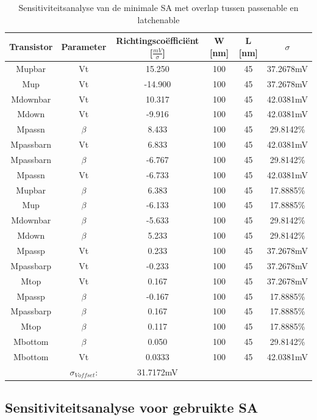 \begin{table}
\begin{tabular}{cccccc}
\hline 
Transistor & Parameter & Richtingscoëfficiënt [$\frac{mV}{\sigma}$] & W [nm] & L [nm] & $\sigma$ \\ 
\hline 
Mupbar & Vt & 15.250 & 100 & 45 & 37.2678mV \\ 
Mup & Vt & -14.900 & 100 & 45 & 37.2678mV \\ 
Mdownbar & Vt & 10.317 & 100 & 45 & 42.0381mV \\ 
Mdown & Vt & -9.916 & 100 & 45 & 42.0381mV \\
Mpassn & $\beta$ & 8.433 & 100 & 45 & 29.8142\% \\ 
Mpassbarn & Vt & 6.833 & 100 & 45 & 42.0381mV \\
Mpassbarn & $\beta$ & -6.767 & 100 & 45 & 29.8142\% \\
Mpassn & Vt & -6.733 & 100 & 45 & 42.0381mV \\ 
Mupbar & $\beta$ & 6.383 & 100 & 45 & 17.8885\% \\ 
Mup & $\beta$ & -6.133 & 100 & 45 & 17.8885\% \\ 
Mdownbar & $\beta$ & -5.633 & 100 & 45 & 29.8142\% \\  
Mdown & $\beta$ & 5.233 & 100 & 45 & 29.8142\% \\ 
Mpassp & Vt & 0.233 & 100 & 45 & 37.2678mV \\
Mpassbarp & Vt & -0.233 & 100 & 45 & 37.2678mV \\
Mtop & Vt & 0.167 & 100 & 45 & 37.2678mV \\  
Mpassp & $\beta$ & -0.167 & 100 & 45 & 17.8885\% \\ 
Mpassbarp & $\beta$ & 0.167 & 100 & 45 & 17.8885\% \\ 
Mtop & $\beta$ & 0.117 & 100 & 45 & 17.8885\% \\
Mbottom & $\beta$ & 0.050 & 100 & 45 & 29.8142\% \\ 
Mbottom & Vt & 0.0333 & 100 & 45 & 42.0381mV \\ 
\hline 
\hline & $\sigma_{Voffset}$: & 31.7172mV & & & \\
\hline
\end{tabular} 
\caption[Sensitiviteitsanalyse van de minimale SA met overlap tussen passenable en latchenable]{Sensitiviteitsanalyse van de minimale SA met overlap tussen passenable en latchenable}
\label{tab:min-sensanalysis-overlap}
\end{table}

\subsection{Sensitiviteitsanalyse voor gebruikte SA}

